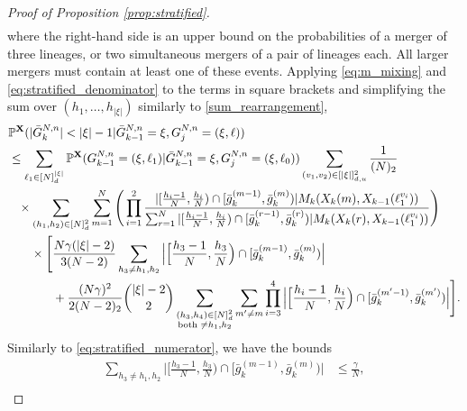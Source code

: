 \documentclass[a4paper,11pt]{article}
\theoremstyle{definition}
\newcommand{\bbP}{\mathbb{P}}
\newcommand{\bfX}{\mathbf{X}}
\begin{document}
\begin{proof}[Proof of Proposition \ref{prop:stratified}]
\begin{align*}
\end{align*}
where the right-hand side is an upper bound on the probabilities of a merger of three lineages, or two simultaneous mergers of a pair of lineages each.
All larger mergers must contain at least one of these events.
Applying \eqref{eq:m_mixing} and \eqref{eq:stratified_denominator} to the terms in square brackets and simplifying the sum over $( h_1, \ldots, h_{ | \xi | } )$ similarly to \eqref{sum_rearrangement}, 
\begin{align}
&\bbP^{ \bfX }( | \bar{ G }_k^{ N, n } | < | \xi | - 1 | \bar{ G }_{ k - 1 }^{ N, n } = \xi, G_j^{ N, n } = ( \xi, \ell ) ) \notag \\
&\leq \sum_{ \ell_1 \in [ N ]_d^{ | \xi | } } \bbP^{ \bfX }( G_{ k - 1 }^{ N, n } = ( \xi, \ell_1 ) | \bar{ G }_{ k - 1 }^{ N, n } = \xi, G_j^{ N, n } = ( \xi, \ell_0 ) ) \sum_{ ( v_1, v_2 ) \in [ | \xi | ]_{ d, u }^2 } \frac{ 1 }{ ( N )_2 } \notag \\
&\phantom{\leq} \times \sum_{ ( h_1, h_2 ) \in [ N ]_d^2 } \sum_{ m = 1 }^N \Bigg( \prod_{ i = 1 }^2 \frac{ | [ \frac{ h_i - 1 }{ N }, \frac{ h_i }{ N } ) \cap [ \bar{ g }_k^{ ( m - 1 ) }, \bar{ g }_k^{ ( m ) } ) | M_k( X_k( m ), X_{ k - 1 }( \ell_1^{ v_i } ) ) }{ \sum_{ r = 1 }^N | [ \frac{ h_i - 1 }{ N }, \frac{ h_i }{ N } ) \cap [ \bar{ g }_k^{ ( r - 1 ) }, \bar{ g }_k^{ ( r ) } ) | M_k( X_k( r ), X_{ k - 1 }( \ell_1^{ v_i } ) ) } \Bigg) \notag \\
&\phantom{\leq \times } \times \Bigg[ \frac{ N \gamma  ( | \xi | - 2 ) }{ 3 ( N - 2 ) } \sum_{ h_3 \neq h_1, h_2 } \Big| \Big[ \frac{ h_3 - 1 }{ N }, \frac{ h_3 }{ N } \Big) \cap [ \bar{ g }_k^{ ( m - 1 ) }, \bar{ g }_k^{ ( m ) } ) \Big| \notag \\
&\phantom{\leq \times \times \Bigg[} + \frac{ ( N \gamma )^2 }{ 2 ( N - 2 )_2 } \binom{ | \xi | - 2 }{ 2 }  \sum_{ \substack{ ( h_3, h_4 ) \in [ N ]_d^2 \\ \text{both } \neq h_1, h_2 } } \sum_{ m' \neq m } \prod_{ i = 3 }^4 \Big| \Big[ \frac{ h_i - 1 }{ N }, \frac{ h_i }{ N } \Big) \cap [ \bar{ g }_k^{ ( m' - 1 ) }, \bar{ g }_k^{ ( m' ) } ) \Big| \Bigg]. \label{eq:stratified_multiple_merger_bound}
\end{align}
Similarly to \eqref{eq:stratified_numerator}, we have the bounds
\begin{align*}
\sum_{ h_3 \neq h_1, h_2 } \Big| \Big[ \frac{ h_3 - 1 }{ N }, \frac{ h_3 }{ N } \Big) \cap [ \bar{ g }_k^{ ( m - 1 ) }, \bar{ g }_k^{ ( m ) } ) \Big| &\leq\frac{ \gamma }{ N }, \\

\end{align*}
\end{proof}
\end{document}
